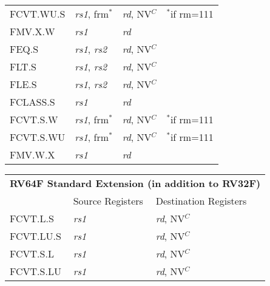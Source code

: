 \begin{tabular}{p{25mm}|p{3cm}|p{6cm}|p{10cm}}
   \cline{2-3}
   FCVT.WU.S & {\em rs1}, frm$^*$ & {\em rd}, NV$^C$ & $^*$if rm=111 \\
   \cline{2-3}
   FMV.X.W & {\em rs1} & {\em rd} &  \\
   \cline{2-3}
   FEQ.S & {\em rs1}, {\em rs2} & {\em rd}, NV$^C$ &  \\
   \cline{2-3}
   FLT.S & {\em rs1}, {\em rs2} & {\em rd}, NV$^C$ &  \\
   \cline{2-3}
   FLE.S & {\em rs1}, {\em rs2} & {\em rd}, NV$^C$ &  \\
   \cline{2-3}
   FCLASS.S & {\em rs1} & {\em rd} &  \\
   \cline{2-3}
   FCVT.S.W & {\em rs1}, frm$^*$ & {\em rd}, NV$^C$ & $^*$if rm=111 \\
   \cline{2-3}
   FCVT.S.WU & {\em rs1}, frm$^*$ & {\em rd}, NV$^C$ & $^*$if rm=111 \\
   \cline{2-3}
   FMV.W.X & {\em rs1} & {\em rd} &  \\
   \cline{2-3}
\end{tabular}

\begin{tabular}{p{25mm}|p{3cm}|p{6cm}|p{10cm}}
  \multicolumn{4}{l}{\bf RV64F Standard Extension (in addition to RV32F)} \\
  \cline{2-3}
   & Source Registers & Destination Registers \\
  \cline{2-3}
   FCVT.L.S & {\em rs1} & {\em rd}, NV$^C$ &  \\
   \cline{2-3}
   FCVT.LU.S & {\em rs1} & {\em rd}, NV$^C$ &  \\
   \cline{2-3}
   FCVT.S.L & {\em rs1} & {\em rd}, NV$^C$ &  \\
   \cline{2-3}
   FCVT.S.LU & {\em rs1} & {\em rd}, NV$^C$ &  \\
   \cline{2-3}
\end{tabular}

